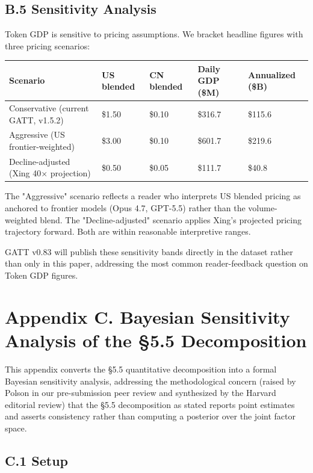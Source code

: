 \documentclass[11pt,a4paper]{article}
\begin{document}
\subsection{B.5 Sensitivity Analysis}

Token GDP is sensitive to pricing assumptions. We bracket headline figures with three pricing scenarios:

\begin{center}
\begin{tabular}{lllll}
\toprule
Scenario & US blended & CN blended & Daily GDP (\$M) & Annualized (\$B) \\
\midrule
Conservative (current GATT, v1.5.2) & \$1.50 & \$0.10 & \$316.7 & \$115.6 \\
Aggressive (US frontier-weighted) & \$3.00 & \$0.10 & \$601.7 & \$219.6 \\
Decline-adjusted (Xing 40× projection) & \$0.50 & \$0.05 & \$111.7 & \$40.8 \\
\bottomrule
\end{tabular}
\end{center}


The "Aggressive" scenario reflects a reader who interprets US blended pricing as anchored to frontier models (Opus 4.7, GPT-5.5) rather than the volume-weighted blend. The "Decline-adjusted" scenario applies Xing's \cite{xing2026token} projected pricing trajectory forward. Both are within reasonable interpretive ranges.

GATT v0.83 will publish these sensitivity bands directly in the dataset rather than only in this paper, addressing the most common reader-feedback question on Token GDP figures.


\section{Appendix C. Bayesian Sensitivity Analysis of the §5.5 Decomposition}

This appendix converts the §5.5 quantitative decomposition into a formal Bayesian sensitivity analysis, addressing the methodological concern (raised by Polson in our pre-submission peer review and synthesized by the Harvard editorial review) that the §5.5 decomposition as stated reports point estimates and asserts consistency rather than computing a posterior over the joint factor space.

\subsection{C.1 Setup}
\end{document}
